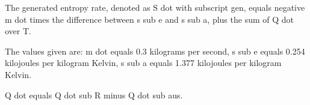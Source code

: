The generated entropy rate, denoted as S dot with subscript gen, equals negative m dot times the difference between s sub e and s sub a, plus the sum of Q dot over T.

The values given are:
m dot equals 0.3 kilograms per second,
s sub e equals 0.254 kilojoules per kilogram Kelvin,
s sub a equals 1.377 kilojoules per kilogram Kelvin.

Q dot equals Q dot sub R minus Q dot sub aus.